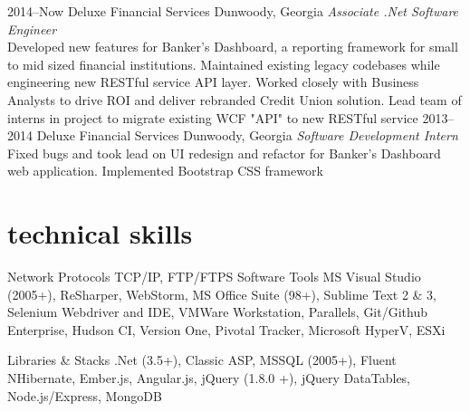 \documentclass[]{friggeri-cv} %
\begin{document}
\begin{entrylist}
\entry
{2014--Now}
{Deluxe Financial Services}
{Dunwoody, Georgia}
{\emph{Associate .Net Software Engineer} \\
Developed new features for Banker's Dashboard, a reporting framework for small to mid sized financial institutions.
Maintained existing legacy codebases while engineering new RESTful service API layer.
Worked closely with Business Analysts to drive ROI and deliver rebranded Credit Union solution.
Lead team of interns in project to migrate existing WCF "API" to new RESTful service}
\entry
{2013--2014}
{Deluxe Financial Services}
{Dunwoody, Georgia}
{\emph{Software Development Intern} \\
Fixed bugs and took lead on UI redesign and refactor for Banker's Dashboard web application.
Implemented Bootstrap CSS framework}
\end{entrylist}


\section{technical skills}

\begin{entrylist}
\entry
{}
{Network Protocols}
{}
{TCP/IP, FTP/FTPS}
\entry
{}
{Software Tools}
{}
{MS Visual Studio (2005+), ReSharper, WebStorm, MS Office Suite (98+), Sublime Text 2 \& 3, Selenium Webdriver and IDE, VMWare Workstation, Parallels, Git/Github Enterprise, Hudson CI, Version One, Pivotal Tracker, Microsoft HyperV, ESXi}

\entry
{}
{Libraries \& Stacks}
{}
{.Net (3.5+), Classic ASP, MSSQL (2005+), Fluent NHibernate,
Ember.js, Angular.js, jQuery (1.8.0 +), jQuery DataTables, Node.js/Express, MongoDB}
\end{entrylist}

\end{document}

